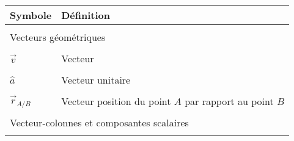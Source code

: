 \begin{center}
	\begin{tabular}{p{5cm}  p{9cm}}
		\hline
		\textbf{Symbole} & \textbf{Définition} \\ \hline\hline \\
		\multicolumn{2}{l}{Vecteurs géométriques} \\ \hline \\
		$\vec{v}$            & Vecteur      \\   &  \\
		$\hat{a}$            & Vecteur unitaire   \\   &  \\
		$\vec{r}_{A/B}$      & Vecteur position du point $A$ par rapport au point $B$ \\   &  \\
		\multicolumn{2}{l}{Vecteur-colonnes et composantes scalaires} \\ \hline \\

\end{tabular}
\end{center}
